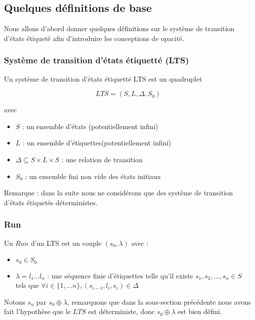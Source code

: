 \documentclass[10pt,a4paper]{article}
\begin{document}
\subsection{Quelques d\'efinitions de base}

Nous allons d'abord donner quelques d\'efinitions sur le syst\`eme de transition d'\'etats \'etiquet\'e afin d'introduire les conceptions de opacit\'e.

\subsubsection{Syst\`eme de transition d'\'etats \'etiquett\'e (LTS)}

Un syst\`eme de transition d'\'etats \'etiquett\'e LTS est un quadruplet 

$$LTS = (S,L,\Delta,S_0)$$

avec
\begin{itemize}
	\item $S$ : un ensemble d'\'etats (potentiellement infini)
	\item $L$ : un ensemble d'étiquettes(potentiellement infini)
	\item $\Delta \subseteq S\times L \times S$ : une relation de transition
	\item $S_0$ : un ensemble fini non vide des \'etats initiaux 
\end{itemize}

Remarque : dans la suite nous ne consid\'erons que des syst\`eme de transition d'\'etats \'etiquet\'es d\'eterministes.

\subsubsection{Run}	

Un $Run$ d'un LTS est un couple $(s_0,\lambda)$ avec :

\begin{itemize}
	\item $s_0 \in S_0$
	\item $\lambda = l_1 \dots l_n$ : une s\'equence finie d'\'etiquettes telle qu'il existe $s_1,s_2,\dots ,s_n \in S$ tels que $\forall i \in \{1, \dots n\}, (s_{i-1},l_i,s_i) \in \Delta$ 
\end{itemize}

Notons $s_n$ par $s_0\oplus \lambda$, remarquons que dans la sous-section pr\'ec\'edente nous avons fait l'hypoth\`ese que le $LTS$ est d\'eterministe, donc $s_0\oplus \lambda$ est bien d\'efini.
\end{document}
